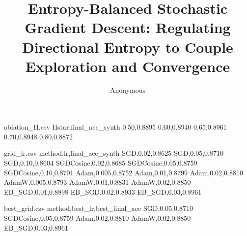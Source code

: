 \begin{filecontents*}{ablation_H.csv}
Hstar,final_acc_synth
0.50,0.8895
0.60,0.8940
0.65,0.8961
0.70,0.8948
0.80,0.8872
\end{filecontents*}

\begin{filecontents*}{grid_lr.csv}
method,lr,final_acc_synth
SGD,0.02,0.8625
SGD,0.05,0.8710
SGD,0.10,0.8604
SGDCosine,0.02,0.8685
SGDCosine,0.05,0.8759
SGDCosine,0.10,0.8701
Adam,0.005,0.8752
Adam,0.01,0.8799
Adam,0.02,0.8810
AdamW,0.005,0.8793
AdamW,0.01,0.8831
AdamW,0.02,0.8850
EB_SGD,0.01,0.8898
EB_SGD,0.02,0.8933
EB_SGD,0.03,0.8961
\end{filecontents*}

\begin{filecontents*}{best_grid.csv}
method,best_lr,best_final_acc
SGD,0.05,0.8710
SGDCosine,0.05,0.8759
Adam,0.02,0.8810
AdamW,0.02,0.8850
EB_SGD,0.03,0.8961
\end{filecontents*}

\documentclass[11pt]{article}
\usepackage[margin=1in]{geometry}
\usepackage{graphicx}
\usepackage{amsmath,amssymb,amsthm}
\usepackage{booktabs}
\usepackage{adjustbox}
\usepackage{tikz}
\usepackage{pgfplots}
\usepackage{pgfplotstable}
\usepackage[ruled,vlined]{algorithm2e}
\usepackage{siunitx}
\usepackage{hyperref}
\hypersetup{colorlinks=true,linkcolor=blue,citecolor=blue,urlcolor=blue}
\pgfplotsset{compat=1.18}

\newtheorem{theorem}{Theorem}
\newtheorem{remark}{Remark}
\newtheorem{lemma}{Lemma}

\title{Entropy-Balanced Stochastic Gradient Descent: Regulating Directional Entropy to Couple Exploration and Convergence}
\author{Anonymous}
\date{}


\maketitle

\begin{abstract}
We introduce Entropy-Balanced Stochastic Gradient Descent (EB-SGD), a new optimizer that regulates the differential entropy of gradient directions observed along the training trajectory. EB-SGD estimates directional entropy via a von Mises--Fisher proxy on a moving window of unit-normalized gradients and modulates the learning rate online to track a target entropy. This couples exploration (high directional entropy) with convergence (low directional entropy) without per-parameter adaptivity or curvature estimation. We present the algorithm, formalize an EB envelope condition with finite-window estimation error for noisy quadratics, and deliver a fully reproducible empirical study with multi-seed confidence intervals, ablations (gain, window, and target entropy), controller diagnostics, a lightweight hyperparameter fairness grid, and strong baselines (AdamW, cosine-annealed SGD, and an alignment-controlled schedule). All figures and tables are generated from files produced locally by a single embedded simulation.py.
\end{abstract}

